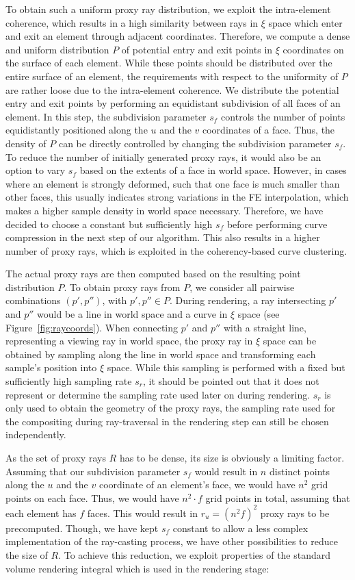\documentclass[journal]{vgtc}                %
\begin{document}
To obtain such a uniform proxy ray distribution, we exploit the intra-element coherence, which results in a high similarity between rays in $\xi$ space which enter and exit an element through adjacent coordinates. Therefore, we compute a dense and uniform distribution $P$ of potential entry and exit points in $\xi$ coordinates on the surface of each element. While these points should be distributed over the entire surface of an element, the requirements with respect to the uniformity of $P$ are rather loose due to the intra-element coherence. We distribute the potential entry and exit points by performing an equidistant subdivision of all faces of an element. In this step, the subdivision parameter $s_f$ controls the number of points equidistantly positioned along the $u$ and the $v$ coordinates of a face. Thus, the density of $P$ can be directly controlled by changing the subdivision parameter $s_f$. To reduce the number of initially generated proxy rays, it would also be an option to vary $s_f$ based on the extents of a face in world space. However, in cases where an element is strongly deformed, such that one face is much smaller than other faces, this usually indicates strong variations in the FE interpolation, which makes a higher sample density in world space necessary. Therefore, we have decided to choose a constant but sufficiently high $s_f$ before performing curve compression in the next step of our algorithm. This also results in a higher number of proxy rays, which is exploited in the coherency-based curve clustering.

The actual proxy rays are then computed based on the resulting point distribution $P$. To obtain proxy rays from $P$, we consider all pairwise combinations $(p',p'')$, with $p',p'' \in P$. During rendering, a ray intersecting $p'$ and $p''$ would be a line in world space and a curve in $\xi$ space (see Figure~\ref{fig:raycoords}). When connecting $p'$ and $p''$ with a straight line, representing a viewing ray in world space, the proxy ray in $\xi$ space can be obtained by sampling along the line in world space and transforming each sample's position into $\xi$ space. While this sampling is performed with a fixed but sufficiently high sampling rate $s_r$, it should be pointed out that it does not represent or determine the sampling rate used later on during rendering. $s_r$ is only used to obtain the geometry of the proxy rays, the sampling rate used for the compositing during ray-traversal in the rendering step can still be chosen independently.

As the set of proxy rays $R$ has to be dense, its size is obviously a limiting factor. Assuming that our subdivision parameter $s_f$ would result in $n$ distinct points along the $u$ and the $v$ coordinate of an element's face, we would have $n^2$ grid points on each face. Thus, we would have $n^2 \cdot f$ grid points in total, assuming that each element has $f$ faces. This would result in $r_u = (n^2 f)^2$ proxy rays to be precomputed. Though, we have kept $s_f$ constant to allow a less complex implementation of the ray-casting process, we have other possibilities to reduce the size of $R$. To achieve this reduction, we exploit properties of the standard volume rendering integral which is used in the rendering stage:
\end{document}
